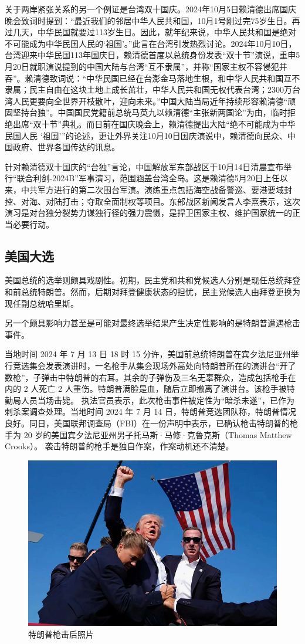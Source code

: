 关于两岸紧张关系的另一个例证是台湾双十国庆。2024年10月5日赖清德出席国庆晚会致词时提到：“最近我们的邻居中华人民共和国，10月1号刚过完75岁生日。再过几天，中华民国就要过113岁生日。因此，就年纪来说，中华人民共和国是绝对不可能成为中华民国人民的‘祖国’。”此言在台湾引发热烈讨论。2024年10月10日，台湾迎来中华民国113年国庆日，赖清德首度以总统身份发表“双十节”演说，重申5月20日就职演说提到的中国大陆与台湾“互不隶属”，并称“国家主权不容侵犯并吞”。赖清德致词说：“中华民国已经在台澎金马落地生根，和中华人民共和国互不隶属；民主自由在这块土地上成长茁壮，中华人民共和国无权代表台湾；2300万台湾人民更要向全世界开枝散叶，迎向未来。”中国大陆当局近年持续形容赖清德“顽固坚持台独”。中国国民党籍前总统马英九以赖清德“主张新两国论”为由，临时拒绝出席“双十节”典礼。而日前在国庆晚会上，赖清德提出大陆“绝不可能成为中华民国人民 ‘祖国’”的论述，更让外界关注10月10日国庆演说中，赖清德向民众、中国政府、世界各国传达的讯息。

针对赖清德双十国庆的“台独”言论，中国解放军东部战区于10月14日清晨宣布举行“联合利剑-2024B”军事演习，范围涵盖台湾全岛。这是赖清德5月20日上任以来，中共军方进行的第二次围台军演。演练重点包括海空战备警巡、要港要域封控、对海、对陆打击；夺取全面制权等项目。东部战区新闻发言人李熹表示，这次演习是对台独分裂势力谋独行径的强力震慑，是捍卫国家主权、维护国家统一的正当必要行动。

\subsection{美国大选}

美国总统的选举则颇具戏剧性。初期，民主党和共和党候选人分别是现任总统拜登和前总统特朗普。然而，后期对拜登健康状态的担忧，民主党候选人由拜登更换为现任副总统哈里斯。

另一个颇具影响力甚至是可能对最终选举结果产生决定性影响的是特朗普遭遇枪击事件。

当地时间 2024 年 7 月 13 日 18 时 15 分许，美国前总统特朗普在宾夕法尼亚州举行竞选集会发表演讲时，一名枪手从集会现场外高处向特朗普所在的演讲台“开了数枪”，子弹击中特朗普的右耳。其余的子弹伤及三名无辜群众，造成包括枪手在内的 2 人死亡 2 人重伤。特朗普满脸是血，随后立即撤离了演讲台。该枪手被特勤局人员当场击毙。
执法官员表示，此次枪击事件被定性为“暗杀未遂”，已作为刺杀案调查处理。当地时间 2024 年 7 月 14 日，特朗普竞选团队称，特朗普情况良好。同日，美国联邦调查局（FBI）在一份声明中表示，已确认枪击特朗普的枪手为 20 岁的美国宾夕法尼亚州男子托马斯·马修·克鲁克斯（Thomas Matthew Crooks）。 袭击特朗普的枪手是独自作案，作案动机还不清楚。


\begin{figure}[htbp]
  \centering
  \includegraphics[width=0.5\linewidth]{./images/trump_shoot.jpg}
  \caption{特朗普枪击后照片}\label{fig:trump_shoot}
\end{figure}

